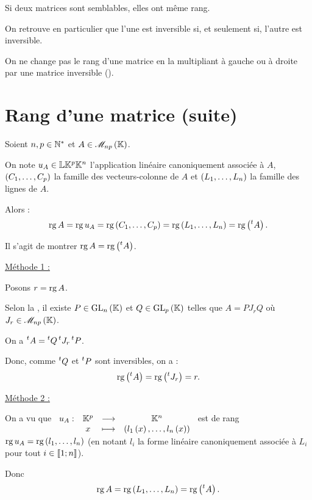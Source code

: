 \begin{rem}
Si deux matrices sont semblables, elles ont même rang.

On retrouve en particulier que l'une est inversible si, et seulement si, l'autre est inversible.
\end{rem}

\begin{dem}
On ne change pas le rang d'une matrice en la multipliant à gauche ou à droite par une matrice inversible (\cf {}).
\end{dem}

\section{Rang d'une matrice (suite)}

\begin{prop}
Soient \(n,p\in\mathbb{N}^*\) et \(A\in\M{np}\).

On note \(u_A\in\mathbb{L}{\mathbb{K}^p}{\mathbb{K}^n}\) l'application linéaire canoniquement associée à \(A\), \(\left(C_1,\dots,C_p\right)\) la famille des vecteurs-colonne de \(A\) et \(\left(L_1,\dots,L_n\right)\) la famille des lignes de \(A\).

Alors : \[\operatorname{rg} A=\operatorname{rg} u_A=\operatorname{rg}\left(C_1,\dots,C_p\right)=\operatorname{rg}\left(L_1,\dots,L_n\right)=\operatorname{rg}\left(\prescript{t}{}{A}\right).\]
\end{prop}

\begin{dem}
Il s'agit de montrer \(\operatorname{rg} A=\operatorname{rg}\left(\prescript{t}{}{A}\right)\).

\underline{Méthode 1 :}

Posons \(r=\operatorname{rg} A\).

Selon la , il existe \(P\in\GL{n}\) et \(Q\in\GL{p}\) telles que \(A=PJ_rQ\) où \(J_r\in\M{np}\).

On a \(\prescript{t}{}{A}=\prescript{t}{}{Q}\prescript{t}{}{J_r}\prescript{t}{}{P}\).

Donc, comme \(\prescript{t}{}{Q}\) et \(\prescript{t}{}{P}\) sont inversibles, on a : \[\operatorname{rg}\left(\prescript{t}{}{A}\right)=\operatorname{rg}\left(\prescript{t}{}{J_r}\right)=r.\]

\underline{Méthode 2 :}

On a vu que \(\begin{array}[t]{cccc}u_A : & \mathbb{K}^p & \longrightarrow & \mathbb{K}^n \\ & x & \longmapsto & \left(l_1\left(x\right),\dots,l_n\left(x\right)\right)\end{array}\) est de rang \(\operatorname{rg} u_A=\operatorname{rg}\left(l_1,\dots,l_n\right)\) (en notant \(l_i\) la forme linéaire canoniquement associée à \(L_i\) pour tout \(i\in\left\llbracket1;n\right\rrbracket\)).

Donc \[\operatorname{rg} A=\operatorname{rg}\left(L_1,\dots,L_n\right)=\operatorname{rg}\left(\prescript{t}{}{A}\right).\]
\end{dem}

